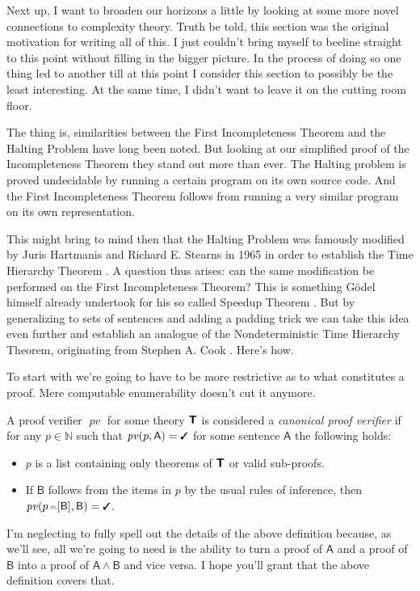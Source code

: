 \documentclass{article}
\theoremstyle{customstyle}
\newcommand{\fm}[1]{\mathsf{#1}}
\DeclareMathOperator{\pc}{\mathit{pv}}
\DeclareMathOperator*{\Cat}{\mathrel{\scalebox{0.6}[0.7]{$\raisebox{0.25ex}{$\frown$}\mkern-17mu\raisebox{-0.25ex}{$\frown$}$}}}
\newcommand{\T}{\textbf{\textsf{T}}}
\newcommand{\cmark}{\text{\small \ding{51}}}
\begin{document}
Next up, I want to broaden our horizons a little by looking at some more novel connections to complexity theory. Truth be told, this section was the original motivation for writing all of this. I just couldn't bring myself to beeline straight to this point without filling in the bigger picture. In the process of doing so one thing led to another till at this point I consider this section to possibly be the least interesting. At the same time, I didn't want to leave it on the cutting room floor.

The thing is, similarities between the First Incompleteness Theorem and the Halting Problem have long been noted. But looking at our simplified proof of the Incompleteness Theorem they stand out more than ever. The Halting problem is proved undecidable by running a certain program on its own source code. And the First Incompleteness Theorem follows from running a very similar program on its own representation.

This might bring to mind then that the Halting Problem was famously modified by Juris Hartmanis and Richard E. Stearns in 1965 in order to establish the Time Hierarchy Theorem \cite{hartmanis-stearns}. A question thus arises: can the same modification be performed on the First Incompleteness Theorem? This is something Gödel himself already undertook for his so called Speedup Theorem \cite{speedup}. But by generalizing to sets of sentences and adding a padding trick we can take this idea even further and establish an analogue of the Nondeterministic Time Hierarchy Theorem, originating from Stephen A. Cook \cite{cook}. Here's how.

To start with we're going to have to be more restrictive as to what constitutes a proof. Mere computable enumerability doesn't cut it anymore.

\begin{definition}
  A proof verifier $\pc$ for some theory $\T$ is considered a \emph{canonical proof verifier} if for any $p \in \mathbb{N}$ such that $\pc(p, \fm{A}) = \cmark$ for some sentence $\fm{A}$ the following holds:
  \begin{itemize}
    \item $p$ is a list containing only theorems of $\T$ or valid sub-proofs.
    \item If $\fm{B}$ follows from the items in $p$ by the usual rules of inference, then $\pc(p \Cat [\fm{B}], \fm{B}) = \cmark$.
  \end{itemize}
\end{definition}
I'm neglecting to fully spell out the details of the above definition because, as we'll see, all we're going to need is the ability to turn a proof of $\fm{A}$ and a proof of $\fm{B}$ into a proof of $\fm{A} \land \fm{B}$ and vice versa. I hope you'll grant that the above definition covers that.
\end{document}
